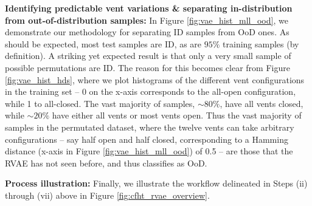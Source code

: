 {\bf Identifying predictable vent variations \& separating in-distribution from out-of-distribution samples:} In Figure \ref{fig:vae_hist_mll_ood}, we demonstrate our methodology for separating ID samples from OoD ones. As should be expected, most test samples are ID, as are $95\%$ training samples (by definition). A striking yet expected result is that only a very small sample of possible permutations are ID. The reason for this becomes clear from Figure \ref{fig:vae_hist_hds}, where we plot histograms of the different vent configurations in the training set -- 0 on the x-axis corresponds to the all-open configuration, while 1 to all-closed. The vast majority of samples, $\sim80\%$, have all vents closed, while $\sim20\%$ have either all vents or most vents open. Thus the vast majority of samples in the permutated dataset, where the twelve vents can take arbitrary configurations -- say half open and half closed, corresponding to a Hamming distance (x-axis in Figure \ref{fig:vae_hist_mll_ood}) of 0.5 -- are those that the RVAE has not seen before, and thus classifies as OoD.

{\bf Process illustration:} Finally, we illustrate the workflow delineated in Steps (ii) through (vii) above in Figure \ref{fig:cfht_rvae_overview}.



